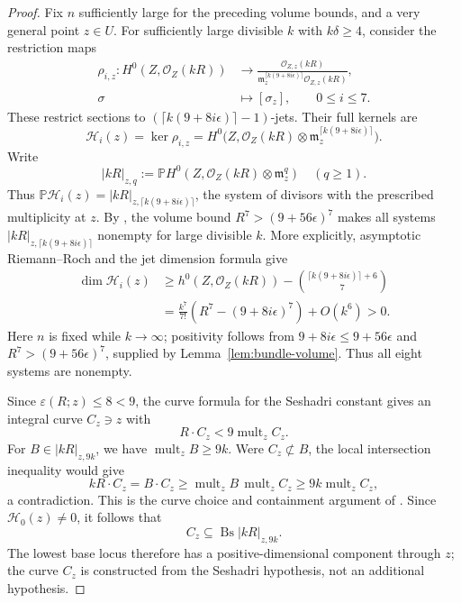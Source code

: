 \documentclass[12pt,a4paper,psamsfonts]{amsart}
\theoremstyle{definition}
\theoremstyle{plain}
\newcommand{\OO}{\mathcal O}
\begin{document}
\begin{proof}
Fix $n$ sufficiently large for the preceding volume bounds, and
a very general point $z\in U$. For sufficiently large divisible
$k$ with $k\delta\ge4$, consider the restriction maps
\[
 \begin{aligned}
 \rho_{i,z}:H^0(Z,\OO_Z(kR))
 &\longrightarrow
 \frac{\OO_{Z,z}(kR)}
      {\mathfrak m_z^{\lceil k(9+8i\epsilon)\rceil}\OO_{Z,z}(kR)},\\
 \sigma&\longmapsto[\sigma_z],\qquad 0\le i\le7.
 \end{aligned}
\]
These restrict sections to $(\lceil k(9+8i\epsilon)\rceil-1)$-jets.
Their full kernels are
\[
 \mathcal H_i(z)=\ker\rho_{i,z}
 =H^0\bigl(Z,\OO_Z(kR)\otimes
             \mathfrak m_z^{\lceil k(9+8i\epsilon)\rceil}\bigr).
\]
Write
\[
 |kR|_{z,q}:=\mathbb P H^0(Z,\OO_Z(kR)\otimes\mathfrak m_z^q)
 \quad(q\ge1).
\]
Thus $\mathbb P\mathcal H_i(z)=|kR|_{z,\lceil k(9+8i\epsilon)\rceil}$,
the system of divisors with the prescribed multiplicity at $z$.
By \cite[Lemma~5.1]{Jets}, the volume bound
$R^7>(9+56\epsilon)^7$ makes all systems
$|kR|_{z,\lceil k(9+8i\epsilon)\rceil}$ nonempty for large divisible $k$.
More explicitly, asymptotic Riemann--Roch and the jet dimension formula give
\[
 \begin{split}
 \dim\mathcal H_i(z)
 &\ge h^0(Z,\OO_Z(kR))-
           \binom{\lceil k(9+8i\epsilon)\rceil+6}{7}\\
 &=\frac{k^7}{7!}(R^7-(9+8i\epsilon)^7)+O(k^6)>0.
 \end{split}
\]
Here $n$ is fixed while $k\to\infty$; positivity follows from
$9+8i\epsilon\le9+56\epsilon$ and $R^7>(9+56\epsilon)^7$, supplied by
Lemma~\ref{lem:bundle-volume}. Thus all eight systems are nonempty.

Since $\varepsilon(R;z)\le8<9$, the curve formula for the
Seshadri constant gives an integral curve $C_z\ni z$ with
\[
 R\cdot C_z<9\operatorname{mult}_z C_z.
\]
For $B\in|kR|_{z,9k}$, we have
$\operatorname{mult}_z B\ge9k$.
Were $C_z\not\subset B$, the local intersection inequality would give
\[
 kR\cdot C_z=B\cdot C_z
 \ge\operatorname{mult}_z B\,\operatorname{mult}_z C_z
 \ge9k\operatorname{mult}_z C_z,
\]
a contradiction. This is the curve choice and containment argument
of \cite[Lemmas~4.2--4.3]{Jets}. Since $\mathcal H_0(z)\ne0$, it follows that
\[
 C_z\subseteq\operatorname{Bs}|kR|_{z,9k}.
\]
The lowest base locus therefore has a positive-dimensional
component through $z$; the curve $C_z$ is constructed from the
Seshadri hypothesis, not an additional hypothesis.


\end{proof}
\end{document}
